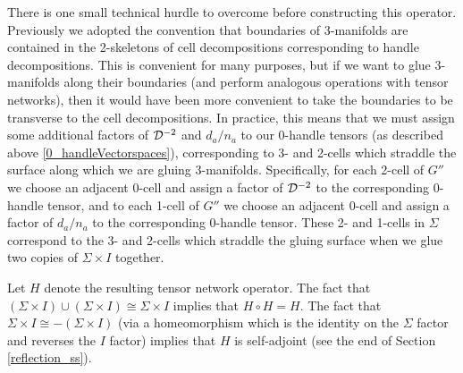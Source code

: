 There is one small technical hurdle to overcome before constructing this operator.
Previously we adopted the convention that boundaries of 3-manifolds are contained in the 2-skeletons of cell decompositions 
corresponding to handle decompositions.
This is convenient for many purposes, but if we want to glue 3-manifolds along their boundaries (and perform analogous operations with
tensor networks), then it would have been more convenient to take the boundaries to be transverse to the cell decompositions.
In practice, this means that we must assign some additional factors of $\mathcal{D}^{-2}$ and $d_a/n_a$ to our 0-handle tensors (as described above \eqref{0_handleVectorspaces}), corresponding to
3- and 2-cells which straddle the surface along which we are gluing 3-manifolds.
Specifically, for each 2-cell of $G''$ we choose an adjacent 0-cell and assign a factor of $\mathcal{D}^{-2}$ to the corresponding 0-handle tensor,
and to each 1-cell of $G''$ we choose an adjacent 0-cell and assign a factor of $d_a/n_a$ to the corresponding 0-handle tensor.
These 2- and 1-cells in $\Sigma$ correspond to the 3- and 2-cells which straddle the gluing surface when we glue two copies
of $\Sigma\times I$ together.

Let $H$ denote the resulting tensor network operator. 
The fact that $(\Sigma\times I) \cup (\Sigma\times I) \cong \Sigma\times I$ implies that
$H\circ H = H$.
The fact that $\Sigma\times I \cong -(\Sigma\times I)$ 
(via a homeomorphism which is the identity on the $\Sigma$ factor and reverses the $I$ factor)
implies that $H$ is self-adjoint
(see the end of Section \ref{reflection_ss}).

